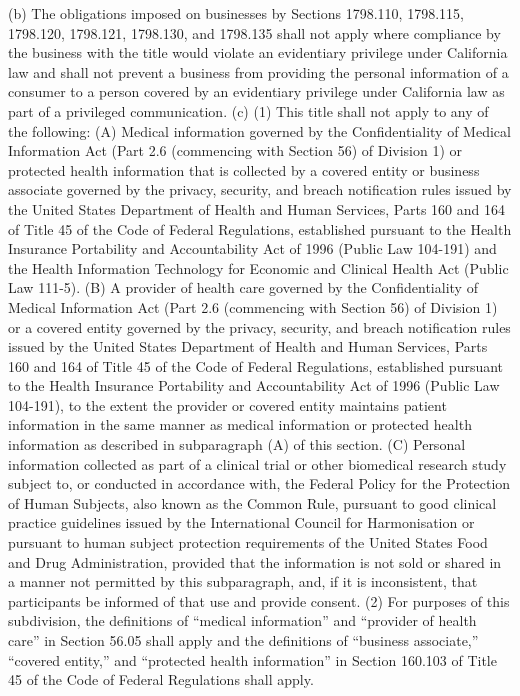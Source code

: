 (b) The obligations imposed on businesses by Sections 1798.110, 1798.115, 1798.120, 1798.121, 1798.130, and 1798.135 shall not apply where compliance by the business with the title would violate an evidentiary privilege under California law and shall not prevent a business from providing the personal information of a consumer to a person covered by an evidentiary privilege under California law as part of a privileged communication.
(c) (1) This title shall not apply to any of the following:
(A) Medical information governed by the Confidentiality of Medical Information Act (Part 2.6 (commencing with Section 56) of Division 1) or protected health information that is collected by a covered entity or business associate governed by the privacy, security, and breach notification rules issued by the United States Department of Health and Human Services, Parts 160 and 164 of Title 45 of the Code of Federal Regulations, established pursuant to the Health Insurance Portability and Accountability Act of 1996 (Public Law 104-191) and the Health Information Technology for Economic and Clinical Health Act (Public Law 111-5).
(B) A provider of health care governed by the Confidentiality of Medical Information Act (Part 2.6 (commencing with Section 56) of Division 1) or a covered entity governed by the privacy, security, and breach notification rules issued by the United States Department of Health and Human Services, Parts 160 and 164 of Title 45 of the Code of Federal Regulations, established pursuant to the Health Insurance Portability and Accountability Act of 1996 (Public Law 104-191), to the extent the provider or covered entity maintains patient information in the same manner as medical information or protected health information as described in subparagraph (A) of this section.
(C) Personal information collected as part of a clinical trial or other biomedical research study subject to, or conducted in accordance with, the Federal Policy for the Protection of Human Subjects, also known as the Common Rule, pursuant to good clinical practice guidelines issued by the International Council for Harmonisation or pursuant to human subject protection requirements of the United States Food and Drug Administration, provided that the information is not sold or shared in a manner not permitted by this subparagraph, and, if it is inconsistent, that participants be informed of that use and provide consent.
(2) For purposes of this subdivision, the definitions of “medical information” and “provider of health care” in Section 56.05 shall apply and the definitions of “business associate,” “covered entity,” and “protected health information” in Section 160.103 of Title 45 of the Code of Federal Regulations shall apply.
